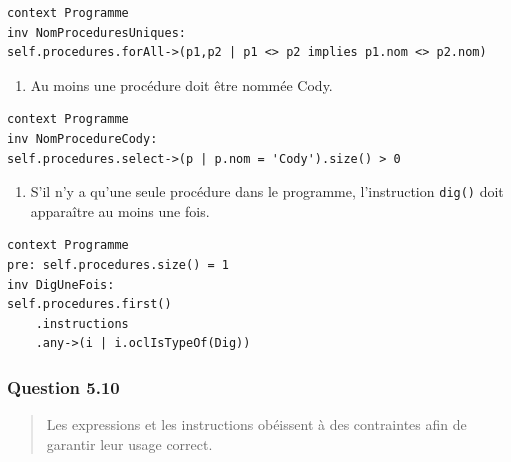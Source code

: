 \documentclass[]{article}
\providecommand{\tightlist}{%
  \setlength{\itemsep}{0pt}\setlength{\parskip}{0pt}}
\begin{document}
\begin{verbatim}
context Programme
inv NomProceduresUniques:
self.procedures.forAll->(p1,p2 | p1 <> p2 implies p1.nom <> p2.nom)
\end{verbatim}

\begin{enumerate}
\def\labelenumi{\arabic{enumi})}
\setcounter{enumi}{2}
\tightlist
\item
  Au moins une procédure doit être nommée Cody.
\end{enumerate}

\begin{verbatim}
context Programme
inv NomProcedureCody:
self.procedures.select->(p | p.nom = 'Cody').size() > 0
\end{verbatim}

\begin{enumerate}
\def\labelenumi{\arabic{enumi})}
\setcounter{enumi}{3}
\tightlist
\item
  S'il n'y a qu'une seule procédure dans le programme, l'instruction
  \texttt{dig()} doit apparaître au moins une fois.
\end{enumerate}

\begin{verbatim}
context Programme
pre: self.procedures.size() = 1
inv DigUneFois:
self.procedures.first()
    .instructions
    .any->(i | i.oclIsTypeOf(Dig))
\end{verbatim}

\hypertarget{question-5.10}{%
\subsubsection{Question 5.10}\label{question-5.10}}

\begin{quote}
Les expressions et les instructions obéissent à des contraintes afin de
garantir leur usage correct.
\end{quote}
\end{document}
